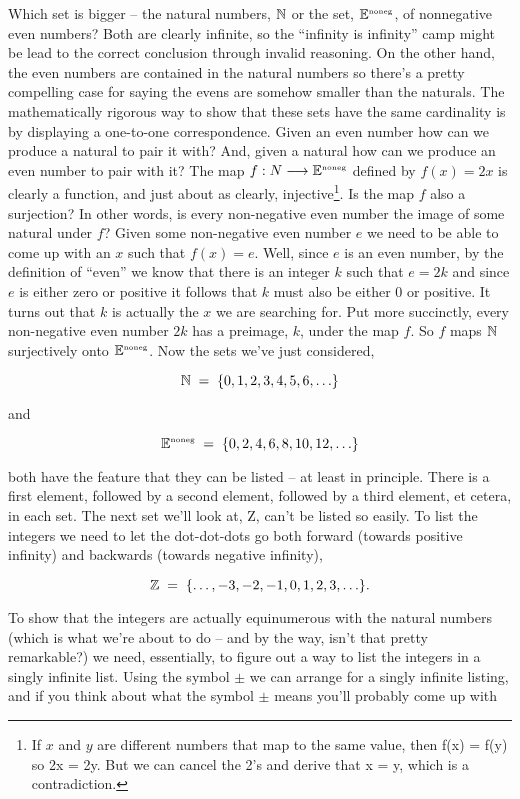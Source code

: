 Which set is bigger -- the natural numbers, ${\mathbb N}$ or the set, 
${\mathbb E}^{\mbox{\tiny noneg}}$, of nonnegative even numbers?
Both are clearly infinite, so the ``infinity is infinity'' camp might be lead
to the correct conclusion through invalid reasoning.  On the other hand,
the even numbers are contained in the natural numbers so there's a pretty
compelling case for saying the evens are somehow smaller than the naturals.  
The mathematically rigorous way to show that these sets have the same
cardinality is by displaying a one-to-one correspondence.  Given an even
number how can we produce a natural to pair it with?  And, given a natural
how can we produce an even number to pair with it?
The map $f : N \longrightarrow {\mathbb E}^{\mbox{\tiny noneg}}$ defined by $f(x) = 2x$ 
is clearly a function,
and just about as clearly, injective\footnote{If $x$ and $y$ are 
different numbers that map to the same value, then f(x) = f(y) so
2x = 2y.  But we can cancel the 2's and derive that x = y, which is a contradiction.}.  Is the map $f$ also a surjection? In other
words, is every non-negative even number the image of some natural under
$f$?  Given some non-negative even number $e$ we need to be able to come
up with an $x$ such that $f(x) = e$.   Well, since $e$ is an even number, by the
definition of ``even'' we know that there is an integer $k$ such that $e = 2k$ 
and since $e$ is either zero or positive it follows that $k$ must also be 
either $0$ or positive.  It turns out that $k$ is actually the $x$ we 
are searching for.  Put more
succinctly, every non-negative even number $2k$ has a preimage, $k$, under the
map $f$.  So $f$ maps ${\mathbb N}$ surjectively onto ${\mathbb E}^{\mbox{\tiny noneg}}$.
Now the sets we've just considered, 

\[ {\mathbb N} \; = \; \{0, 1, 2, 3, 4, 5, 6, \ldots \} \]

\noindent and

\[ {\mathbb E}^{\mbox{\tiny noneg}} \; = \; \{0, 2, 4, 6, 8, 10, 12, \ldots \} \]

\noindent both have the feature that they can be listed -- at 
least in principle.  There is a first element, followed by a 
second element, followed by a third element,
et cetera, in each set.  The next set we'll look at, Z, can't be listed so easily.
To list the integers we need to let the dot-dot-dots go both forward (towards
positive infinity) and backwards (towards negative infinity),

\[ {\mathbb Z} \; = \; \{ \ldots , -3, -2, -1, 0, 1, 2, 3, \ldots \}. \]

\noindent To show that the integers are actually equinumerous with the natural
numbers (which is what we're about to do -- and by the way, isn't that pretty
remarkable?) we need, essentially, to figure out a way to list the integers in
a singly infinite list.  Using the symbol $\pm$ we can arrange for a singly infinite
listing, and if you think about what the symbol $\pm$ means you'll probably
come up with

